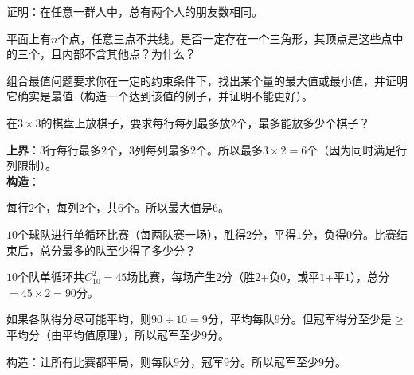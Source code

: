 \begin{exercise}
\item 证明：在任意一群人中，总有两个人的朋友数相同。
\item 平面上有$n$个点，任意三点不共线。是否一定存在一个三角形，其顶点是这些点中的三个，且内部不含其他点？为什么？
\end{exercise}


组合最值问题要求你在一定的约束条件下，找出某个量的最大值或最小值，并证明它确实是最值（构造一个达到该值的例子，并证明不能更好）。

\begin{example}
在$3\times3$的棋盘上放棋子，要求每行每列最多放$2$个，最多能放多少个棋子？
\end{example}
\begin{solution}
\textbf{上界}：$3$行每行最多$2$个，$3$列每列最多$2$个。所以最多$3\times2=6$个（因为同时满足行列限制）。\\
\textbf{构造}：
\begin{center}
\end{center}
每行$2$个，每列$2$个，共$6$个。所以最大值是$6$。
\end{solution}

\begin{example}
$10$个球队进行单循环比赛（每两队赛一场），胜得$2$分，平得$1$分，负得$0$分。比赛结束后，总分最多的队至少得了多少分？
\end{example}
\begin{solution}
$10$个队单循环共$C_{10}^2=45$场比赛，每场产生$2$分（胜$2$+负$0$，或平$1$+平$1$），总分$=45\times2=90$分。

如果各队得分尽可能平均，则$90\div10=9$分，平均每队$9$分。但冠军得分至少是$\ge$平均分（由平均值原理），所以冠军至少$9$分。

构造：让所有比赛都平局，则每队$9$分，冠军$9$分。所以冠军至少$9$分。
\end{solution}

